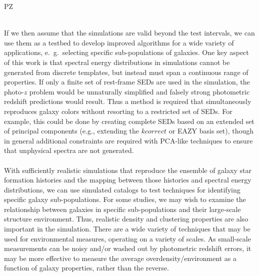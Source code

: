 {\begin{tasklist}{PZ}
\begin{task}
{~\\
If we then assume that the simulations are valid beyond the test intervals, we can use them as a testbed to develop improved algorithms for a wide variety of applications, e.~g.~selecting specific sub-populations of galaxies.  
One key aspect of this work is that spectral energy distributions in simulations cannot be generated from discrete templates, but instead must span a continuous range of properties. If only a finite set of rest-frame SEDs are used in the simulation, the photo-$z$ problem would be unnaturally simplified and  falsely strong photometric redshift predictions would result. Thus a method is required that simultaneously reproduces galaxy colors without resorting to a restricted set of SEDs. For example, this could be done by creating complete SEDs based  on an extended set of principal components (e.g., extending the $kcorrect$ or EAZY basis set), though in general additional constraints are required with PCA-like techniques to ensure that unphysical spectra are not generated.\\
~\\
With sufficiently realistic simulations that reproduce the ensemble of galaxy star formation histories and the mapping between those histories and spectral energy distributions, we can use simulated catalogs to test techniques for identifying specific galaxy sub-populations.  For some studies, we may wish to examine the relationship between galaxies in specific sub-populations and their large-scale structure environment.  Thus, realistic density and clustering properties are also important in the simulation.  There are a wide variety of techniques that may be used for environmental measures, operating on a variety of scales. As small-scale measurements can be noisy and/or washed out by photometric redshift errors, it may be more effective to measure the average overdensity/environment as a function of galaxy properties, rather than the reverse.
}
~\\
\end{task}
\end{tasklist}}
